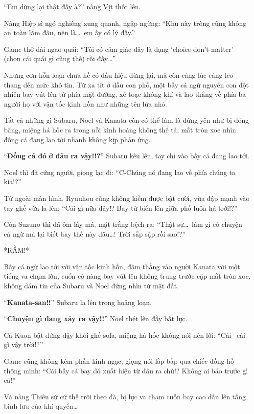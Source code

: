 \documentclass[../main.tex]{subfiles}
\begin{document}
``Em dừng lại thật đấy à?'' nàng Vịt thốt lên.

Nàng Hiệp sĩ ngó nghiêng xung quanh, ngập ngừng: ``Khu này trông cũng không an toàn lắm đâu, nên là\dots\ em ấy có lý đấy.''

Game thở dài ngao quái: ``Tôi có cảm giác đây là dạng `choice-don't-matter' (chọn cái quái gì cũng thế) rồi đấy\dots''

Nhưng cơn hỗn loạn chưa hề có dấu hiệu dừng lại, mà còn càng lúc càng leo thang đến mức khó tin. Từ xa tít ở đầu con phố, một bầy cá ngừ nguyên con đột nhiên bay vút lên từ phía mặt đường, xé toạc không khí và lao thẳng về phía ba người họ với vận tốc kinh hồn như những tên lửa nhỏ.


Tất cả những gì Subaru, Noel và Kanata còn có thể làm là đứng yên như bị đóng băng, miệng há hốc ra trong nỗi kinh hoàng không thể tả, mắt tròn xoe nhìn đống cá đang lao tới nhanh không kịp phản ứng.

``\textbf{Đống cá đó ở đâu ra vậy!!?}'' Subaru kêu lên, tay chỉ vào bầy cá đang lao tới.

Noel thì đã cứng người, giọng lạc đi: ``C-Chúng nó đang lao về phía chúng ta kìa!?''

Từ ngoài màn hình, Ryuuhou cũng không kiềm được bật cười, vừa đập mạnh vào tay ghế vừa la lên: ``Cái gì nữa đây!? Bay từ biển lên giữa phố luôn hả trời!?''

Còn Suzuno thì đã ôm lấy má, mặt trắng bệch ra: ``Thật sự\dots\ làm gì có chuyện cá ngừ mà lại biết bay thế này đâu\dots! Trời sắp sập rồi sao!?''

*RẦM!*

Bầy cá ngừ lao tới với vận tốc kinh hồn, đâm thẳng vào người Kanata với một tiếng va chạm lớn, cuốn cô nàng bay vút lên không trung trước cặp mắt tròn xoe, không dám tin của Subaru và Noel đứng nhìn từ mặt đất.

``\textbf{Kanata-san!!}'' Subaru la lên trong hoảng loạn.

``\textbf{Chuyện gì đang xảy ra vậy!!}'' Noel thét lên đầy bất lực.

Cả Kuon bật đứng dậy khỏi ghế sofa, miệng há hốc không nói nên lời: ``Cái-- cái gì vậy trời!?''

Game cũng không kém phần kinh ngạc, giọng nói lắp bắp qua chiếc đồng hồ thông minh: ``Cái bầy cá bay đó xuất hiện từ đâu ra chứ!? Không ai báo trước gì cả!''

Và nàng Thiên sứ cứ thế trôi theo đà, bị lực va chạm cuốn bay cao dần lên tầng bình lưu của khí quyển\dots
\end{document}
